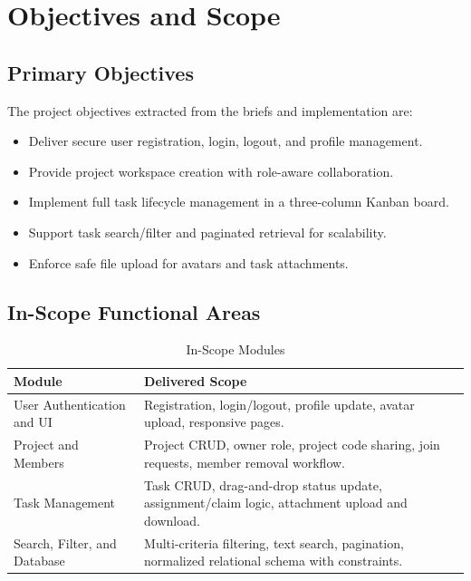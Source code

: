 \section{Objectives and Scope}

\subsection{Primary Objectives}

The project objectives extracted from the briefs and implementation are:
\begin{itemize}
    \item Deliver secure user registration, login, logout, and profile management.
    \item Provide project workspace creation with role-aware collaboration.
    \item Implement full task lifecycle management in a three-column Kanban board.
    \item Support task search/filter and paginated retrieval for scalability.
    \item Enforce safe file upload for avatars and task attachments.
\end{itemize}

\subsection{In-Scope Functional Areas}

\begin{table}[H]
\centering
\caption{In-Scope Modules}
\begin{tabular}{p{} p{}}
\toprule
\textbf{Module} & \textbf{Delivered Scope} \\
\midrule
User Authentication and UI & Registration, login/logout, profile update, avatar upload, responsive pages. \\
Project and Members & Project CRUD, owner role, project code sharing, join requests, member removal workflow. \\
Task Management & Task CRUD, drag-and-drop status update, assignment/claim logic, attachment upload and download. \\
Search, Filter, and Database & Multi-criteria filtering, text search, pagination, normalized relational schema with constraints. \\
\bottomrule
\end{tabular}
\end{table}

